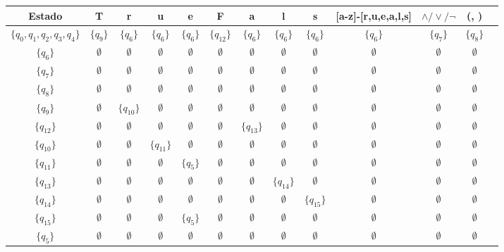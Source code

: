 \begin{table}[H]
\centering
\begin{tabular}{|c|c|c|c|c|c|c|c|c|c|c|c|c|}
\hline
Estado &T & r & u & e & F & a & l &s &[a-z]-[r,u,e,a,l,s] &$\land/\lor/\lnot$ & (, )\\ \hline
\hline
$\{q_0, q_1, q_2, q_3, q_4\}$ & $\{q_9\}$ & $\{q_6\}$ & $\{q_6\}$ & $\{q_{6}\}$ & $\{q_{12}\}$ & $\{q_6\}$ & $\{q_6\}$ & $\{q_6\}$ & $\{q_6\}$ & $\{q_7\}$& $\{q_8\}$\\ \hline
$\{q_6\}$ & $\emptyset$ & $\emptyset$ & $\emptyset$ & $\emptyset$ & $\emptyset$ & $\emptyset$ & $\emptyset$ & $\emptyset$ & $\emptyset$ & $\emptyset$ & $\emptyset$\\ \hline
$\{q_7\}$ & $\emptyset$ & $\emptyset$ & $\emptyset$ & $\emptyset$ & $\emptyset$ & $\emptyset$ & $\emptyset$ & $\emptyset$ & $\emptyset$ & $\emptyset$ & $\emptyset$\\ \hline
$\{q_8\}$ & $\emptyset$ & $\emptyset$ & $\emptyset$ & $\emptyset$ & $\emptyset$ & $\emptyset$ & $\emptyset$ & $\emptyset$ & $\emptyset$ & $\emptyset$ & $\emptyset$\\ \hline
$\{q_9\}$ & $\emptyset$ & $\{q_{10}\}$ & $\emptyset$ & $\emptyset$ & $\emptyset$  & $\emptyset$ & $\emptyset$ & $\emptyset$ & $\emptyset$ & $\emptyset$ & $\emptyset$\\ \hline
$\{q_{12}\}$ & $\emptyset$ & $\emptyset$ & $\emptyset$ & $\emptyset$ & $\emptyset$  & $\{q_{13}\}$ & $\emptyset$ & $\emptyset$& $\emptyset$ & $\emptyset$ & $\emptyset$\\ \hline
$\{q_{10}\}$ & $\emptyset$ &  $\emptyset$&  $\{q_{11}\}$& $\emptyset$ & $\emptyset$  & $\emptyset$ & $\emptyset$ & $\emptyset$ & $\emptyset$ & $\emptyset$ & $\emptyset$\\ \hline
$\{q_{11}\}$ & $\emptyset$ &  $\emptyset$& $\emptyset$ &  $\{q_{5}\}$& $\emptyset$  & $\emptyset$ & $\emptyset$ & $\emptyset$ & $\emptyset$ & $\emptyset$ & $\emptyset$\\ \hline
$\{q_{13}\}$ & $\emptyset$ &  $\emptyset$& $\emptyset$ & $\emptyset$ & $\emptyset$  & $\emptyset$ & $\{q_{14}\}$ & $\emptyset$ & $\emptyset$ & $\emptyset$ & $\emptyset$\\ \hline
$\{q_{14}\}$ & $\emptyset$ &  $\emptyset$& $\emptyset$ & $\emptyset$ & $\emptyset$  & $\emptyset$ & $\emptyset$ & $\{q_{15}\}$ & $\emptyset$ & $\emptyset$ & $\emptyset$\\ \hline
$\{q_{15}\}$ & $\emptyset$ &  $\emptyset$& $\emptyset$ & $\{q_{5}\}$ & $\emptyset$  & $\emptyset$ & $\emptyset$ & $\emptyset$ & $\emptyset$ & $\emptyset$ & $\emptyset$\\ \hline
$\{q_{5}\}$ & $\emptyset$ &  $\emptyset$& $\emptyset$ & $\emptyset$ & $\emptyset$  & $\emptyset$ & $\emptyset$ & $\emptyset$ & $\emptyset$ & $\emptyset$ & $\emptyset$\\ \hline
\end{tabular}

\end{table}



